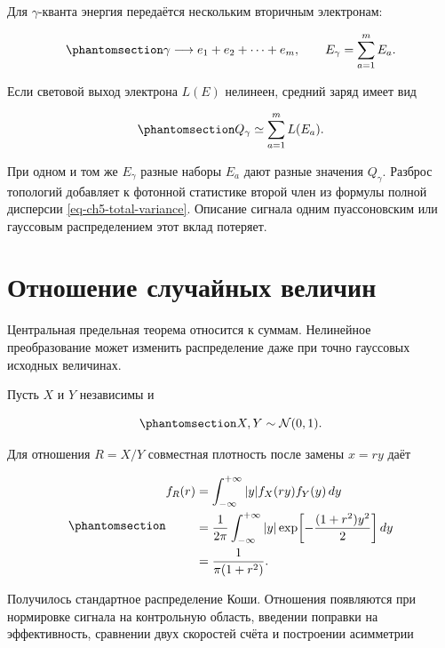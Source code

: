 \documentclass[
  russian,
  11pt,
  a4paper,
  open=any]{scrbook}
\begin{document}
Для \(\gamma\)-кванта энергия передаётся нескольким вторичным
электронам:

\begin{equation}\protect\phantomsection\label{eq-ch5-gamma-secondary-electrons}{
\gamma\longrightarrow e_1+e_2+\cdots+e_m,
\qquad
E_\gamma=\sum_{a=1}^{m}E_a.
}\end{equation}

Если световой выход электрона \(L(E)\) нелинеен, средний заряд имеет вид

\begin{equation}\protect\phantomsection\label{eq-ch5-gamma-light-yield}{
Q_\gamma\simeq\sum_{a=1}^{m}L(E_a).
}\end{equation}

При одном и том же \(E_\gamma\) разные наборы \(E_a\) дают разные
значения \(Q_\gamma\). Разброс топологий добавляет к фотонной статистике
второй член из формулы полной дисперсии \ref{eq-ch5-total-variance}.
Описание сигнала одним пуассоновским или гауссовым распределением этот
вклад потеряет.

\section{Отношение случайных величин}\label{interactive-ratio-cauchy}

Центральная предельная теорема относится к суммам. Нелинейное
преобразование может изменить распределение даже при точно гауссовых
исходных величинах.

Пусть \(X\) и \(Y\) независимы и

\begin{equation}\protect\phantomsection\label{eq-ch5-standard-normal-ratio-inputs}{
X,Y\sim\mathcal N(0,1).
}\end{equation}

Для отношения \(R=X/Y\) совместная плотность после замены \(x=ry\) даёт

\begin{equation}\protect\phantomsection\label{eq-ch5-normal-ratio-cauchy}{
\begin{aligned}
f_R(r)
&=\int_{-\infty}^{+\infty}|y|f_X(ry)f_Y(y)\,dy\\
&=\frac1{2\pi}\int_{-\infty}^{+\infty}
|y|\exp\!\left[-\frac{(1+r^2)y^2}{2}\right]dy\\
&=\frac1{\pi(1+r^2)}.
\end{aligned}
}\end{equation}

Получилось стандартное распределение Коши. Отношения появляются при
нормировке сигнала на контрольную область, введении поправки на
эффективность, сравнении двух скоростей счёта и построении асимметрии
\end{document}
